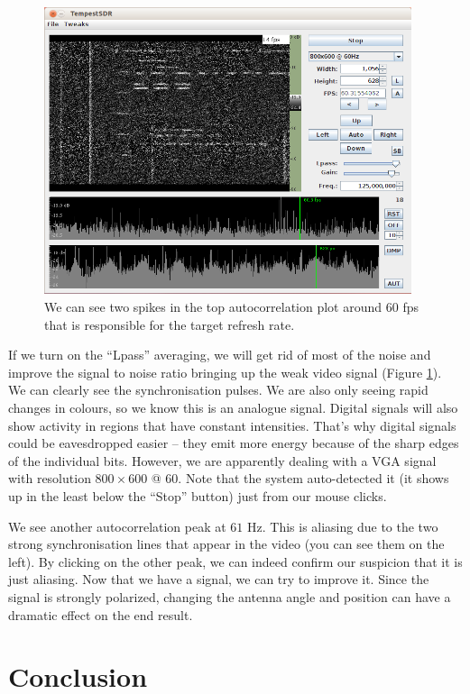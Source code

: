 \documentclass[a4paper,12pt,twoside,openright]{report}
\begin{document}
\begin{figure}[h]
\centering
  \includegraphics[width=0.96\textwidth]{demo_receivingimage}
  \caption{We can see two spikes in the top autocorrelation plot around $60$ fps that is responsible for the target refresh rate.}
  \label{fig:demoreception}
\end{figure}

If we turn on the ``Lpass'' averaging, we will get rid of most of the noise and improve the signal to noise ratio bringing up the weak video signal (Figure \ref{fig:demoreception}). We can clearly see the synchronisation pulses. We are also only seeing rapid changes in colours, so we know this is an analogue signal. Digital signals will also show activity in regions that have constant intensities. That's why digital signals could be eavesdropped easier -- they emit more energy because of the sharp edges of the individual bits. However, we are apparently dealing with a VGA signal with resolution $800 \times 600$ @ $60$. Note that the system auto-detected it (it shows up in the least below the ``Stop'' button) just from our mouse clicks.

We see another autocorrelation peak at $61$ Hz. This is aliasing due to the two strong synchronisation lines that appear in the video (you can see them on the left). By clicking on the other peak, we can indeed confirm our suspicion that it is just aliasing. Now that we have a signal, we can try to improve it. Since the signal is strongly polarized, changing the antenna angle and position can have a dramatic effect on the end result. 

\section{Conclusion}
\end{document}
